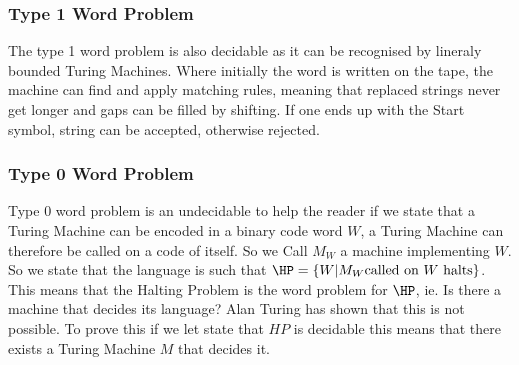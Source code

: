 \subsubsection{Type 1 Word Problem}
The type 1 word problem is also decidable as it can be recognised by lineraly bounded Turing Machines. Where initially the word is written on the tape, the machine can find and apply matching rules, meaning that replaced strings never get longer and gaps can be filled by shifting. If one ends up with the Start symbol, string can be accepted, otherwise rejected.
\subsubsection{Type 0 Word Problem}
Type 0 word problem is an undecidable to help the reader if 
we state that a Turing Machine can be encoded in a binary code word $W$, a Turing Machine can therefore be called on a code of itself. So we Call $M_W$ a machine implementing $W$. So we state that the language is such that $\HP = \{W|M_W \text{called on $W$ halts} \}$. This means that the Halting Problem is the word problem for $\HP$, ie. Is there a machine that decides its language? Alan Turing has shown that this is not possible.
To prove this if we let state that $HP$ is decidable this means that there exists a Turing Machine $M$ that decides it.
